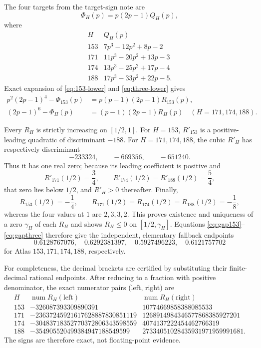 \documentclass[11pt]{article}
\begin{document}
The four targets from the target-sign note are
\[
 \Phi_H(p)=p(2p-1)Q_H(p),
\]
where
\[
\begin{array}{c|l}
H&Q_H(p)\\ \hline
153&7p^3-12p^2+8p-2\\
171&11p^3-20p^2+13p-3\\
174&13p^3-25p^2+17p-4\\
188&17p^3-33p^2+22p-5.
\end{array}
\]
Exact expansion of \eqref{eq:153-lower} and
\eqref{eq:three-lower} gives
\begin{align}
 p^2(2p-1)^4-\Phi_{153}(p)
 &=p(p-1)(2p-1)R_{153}(p),\label{eq:gap153}\\
 (2p-1)^6-\Phi_H(p)
 &=(p-1)(2p-1)R_H(p)
 \quad(H=171,174,188).\label{eq:gapthree}
\end{align}

Every $R_H$ is strictly increasing on $[1/2,1]$.  For $H=153$,
$R'_{153}$ is a positive-leading quadratic of discriminant $-188$.
For $H=171,174,188$, the cubic $R'_H$ has respectively discriminant
\[
 -233324,\qquad-669356,\qquad-651240.
\]
Thus it has one real zero; because its leading coefficient is positive
and
\[
 R'_{171}(1/2)=\frac34,
 \qquad
 R'_{174}(1/2)=R'_{188}(1/2)=\frac54,
\]
that zero lies below $1/2$, and $R'_H>0$ thereafter.  Finally,
\[
 R_{153}(1/2)=-\frac14,
 \qquad
 R_{171}(1/2)=R_{174}(1/2)=R_{188}(1/2)=-\frac18,
\]
whereas the four values at $1$ are $2,3,3,2$.  This proves existence
and uniqueness of a zero $\gamma_H$ of each $R_H$ and shows
$R_H\leq0$ on $[1/2,\gamma_H]$.  Equations
\eqref{eq:gap153}--\eqref{eq:gapthree} therefore give the independent,
elementary fallback endpoints
\[
 0.6128767076,\quad 0.6292381397,\quad
 0.5927496223,\quad 0.6121757702
\]
for Atlas $153,171,174,188$, respectively.

For completeness, the decimal brackets are certified by substituting
their finite-decimal rational endpoints.  After reducing to a fraction
with positive denominator, the exact numerator pairs (left, right) are
\[
\begin{array}{c|r|r}
H&\operatorname{num}R_H(\text{left})&
\operatorname{num}R_H(\text{right})\\ \hline
153&-326087393309890391&10774669858388085533\\
171&-23637245921617628887830851119&1268914984346577868385927201\\
174&-30483718352770372806343598559&4074137222454462766319\\
188&-354905520499384947188549599&27334051028435931971959991681.
\end{array}
\]
The signs are therefore exact, not floating-point evidence.
\end{document}
